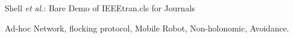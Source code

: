 \documentclass[journal]{IEEEtran}
\begin{document}
					      {Shell \MakeLowercase{\textit{et al.}}: Bare Demo of IEEEtran.cls for Journals}











					      \maketitle


					      \begin{abstract}
					      \blindtext[1]
					      \end{abstract}

					      \begin{IEEEkeywords}
					      Ad-hoc Network, flocking protocol, Mobile Robot, Non-holonomic, Avoidance.
					      \end{IEEEkeywords}

					      \IEEEpeerreviewmaketitle
\end{document}
